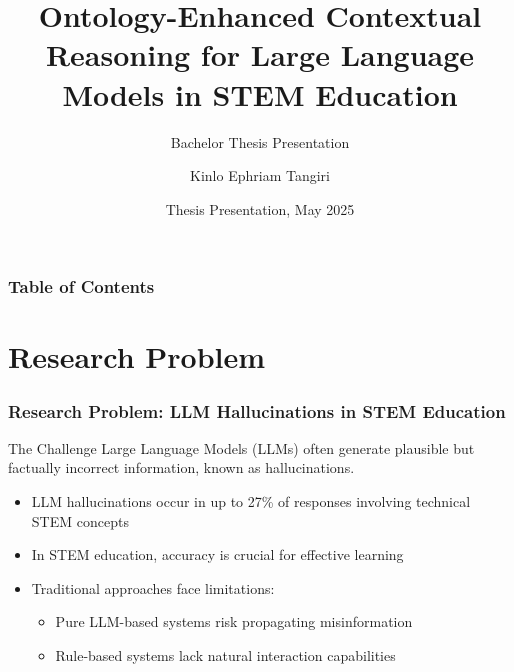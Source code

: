 \documentclass{beamer}
\title[Ontology-Enhanced LLMs] %
{Ontology-Enhanced Contextual Reasoning for Large Language Models in STEM Education}
\subtitle{Bachelor Thesis Presentation}
\author[Kinlo] %
{Kinlo Ephriam Tangiri}
\institute[Constructor University] %
{
  Department of Computer Science\\
  Constructor University\\
  \smallskip
  \small{Supervisor: Prof. Dr. Fatahi Valilai, Omid}
}
\date[May 2025] %
{Thesis Presentation, May 2025}
\begin{document}
\frame{\titlepage}


\begin{frame}
\frametitle{Table of Contents}
\tableofcontents
\end{frame}


\section{Research Problem}

\begin{frame}
\frametitle{Research Problem: LLM Hallucinations in STEM Education}

\begin{block}{The Challenge}
Large Language Models (LLMs) often generate plausible but factually incorrect information, known as hallucinations.
\end{block}

\begin{itemize}
    \item<1-> LLM hallucinations occur in up to 27\% of responses involving technical STEM concepts
    \item<2-> In STEM education, accuracy is crucial for effective learning
    \item<3-> Traditional approaches face limitations:
    \begin{itemize}
        \item<3-> Pure LLM-based systems risk propagating misinformation
        \item<3-> Rule-based systems lack natural interaction capabilities
    \end{itemize}
\end{itemize}
\end{frame}

\end{document}
